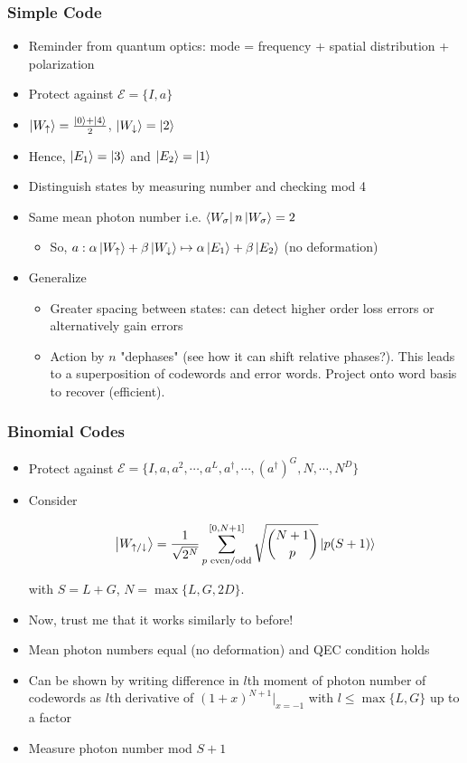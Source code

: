 \documentclass{beamer}
\newcommand\0{\mathbf{0}}
\begin{document}
\begin{frame}
\frametitle{Simple Code}
\begin{itemize}
\item Reminder from quantum optics: mode = frequency + spatial distribution + polarization
\item Protect against $\mathcal{E} = \{ I,a\}$
\item $\ket{W_\uparrow} = \frac{\ket{0} + \ket{4}}{2}$, $\ket{W_\downarrow} = \ket{2}$
\pause
\item Hence, $\ket{E_1} = \ket{3}$ and $\ket{E_2} = \ket{1}$
\item Distinguish states by measuring number and checking mod 4
\pause
\item Same mean photon number i.e. $\bra{W_\sigma} n \ket{W_\sigma} = 2$
\begin{itemize}
\item So, $a : \alpha\ket{W_\uparrow} + \beta\ket{W_\downarrow} \mapsto \alpha \ket{E_1} + \beta \ket{E_2}$ (no deformation)
\end{itemize}
\pause
\item Generalize
\begin{itemize}
\item Greater spacing between states: can detect higher order loss errors or alternatively gain errors
\item Action by $n$ "dephases" (see how it can shift relative phases?). This leads to a superposition of codewords and error words. Project onto word basis to recover (efficient).
\end{itemize}
\end{itemize}
\end{frame}

\begin{frame}
\frametitle{Binomial Codes}
\begin{itemize}
\item Protect against $\mathcal{E} = \{I, a, a^2, \cdots, a^L, a^\dag, \cdots, (a^\dag)^G, N, \cdots, N^D \}$
\item Consider

$$
\ket{W_{\uparrow / \downarrow}} = \frac{1}{\sqrt{2^N}} \sum_{ p\text{ even/odd}}^{[0, N+1]} \sqrt{\binom{N+1}{ p }} \ket{p(S+1)}
$$

with $S = L+G$, $N = \max\{L, G, 2D\}$.

\item Now, trust me that it works similarly to before!
\pause
\item Mean photon numbers equal (no deformation) and QEC condition holds
\item Can be shown by writing difference in $l$th moment of photon number of codewords as $l$th derivative of $(1+x)^{N+1}\vert_{x=-1}$ with $l \leq \max\{L, G\}$ up to a factor
\item Measure photon number mod $S+1$
\end{itemize}
\end{frame}
\end{document}
